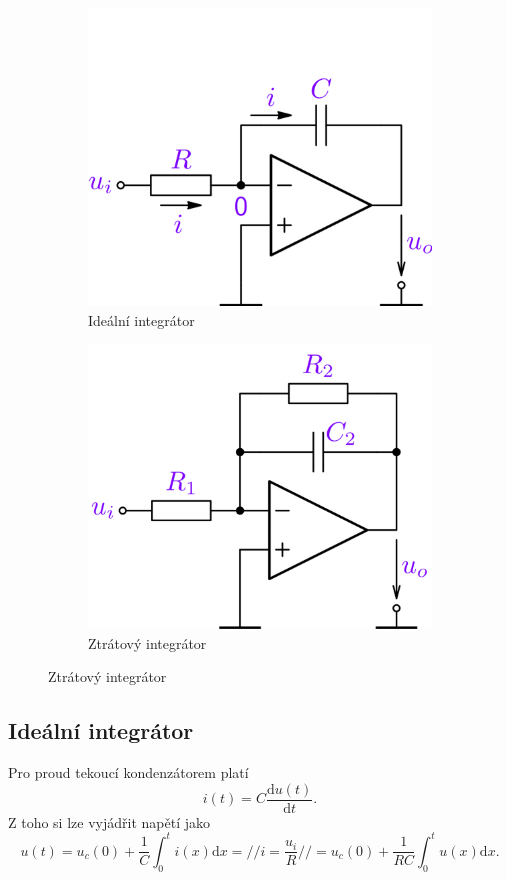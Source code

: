 \documentclass[a4paper,12pt]{article}   %
\begin{document}
\begin{figure}[h!]
    \centering
    \begin{subfigure}{.49\textwidth}
        \centering
        \includegraphics[height=.6\linewidth]{integrator-ideal.PNG}
        \caption{Ideální integrátor}
        \label{sch:integrator:ideal}
    \end{subfigure}
    \begin{subfigure}{.49\textwidth}
        \centering
        \includegraphics[height=.6\linewidth]{integrator-real.PNG}
        \caption{Ztrátový integrátor}
        \label{sch:integrator:ztatovy}
    \end{subfigure}
\end{figure}

\subsection*{Ideální integrátor}
Pro proud tekoucí kondenzátorem platí
\begin{equation*}
    i(t) = C\frac{\text{d}u(t)}{\text{d}t}.
\end{equation*}
Z toho si lze vyjádřit napětí jako
\begin{equation*}
    u(t) = u_c(0) + \frac{1}{C}\int_0^t i(x)\text{d}x =//i=\frac{u_i}{R}//= u_c(0) + \frac{1}{RC}\int_0^t u(x)\text{d}x.
\end{equation*}
\end{document}

